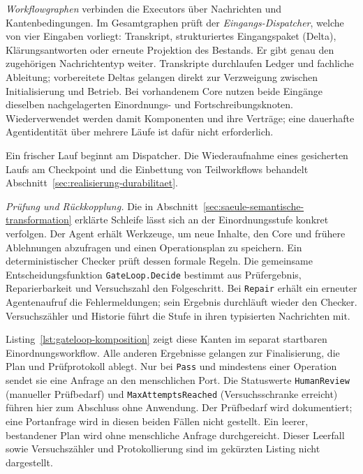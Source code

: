 \emph{Workflowgraphen} verbinden die Executors über Nachrichten
und Kantenbedingungen. Im Gesamtgraphen prüft der
\emph{Eingangs-Dispatcher}, welche von vier Eingaben vorliegt:
Transkript, strukturiertes Eingangspaket (Delta), Klärungsantworten
oder erneute Projektion des Bestands. Er gibt genau den
zugehörigen Nachrichtentyp weiter. Transkripte durchlaufen Ledger
und fachliche Ableitung; vorbereitete Deltas gelangen direkt zur
Verzweigung zwischen Initialisierung und Betrieb. Bei vorhandenem
Core nutzen beide Eingänge dieselben nachgelagerten Einordnungs-
und Fortschreibungsknoten. Wiederverwendet werden damit
Komponenten und ihre Verträge; eine dauerhafte Agentidentität
über mehrere Läufe ist dafür nicht erforderlich.

Ein frischer Lauf beginnt am Dispatcher. Die Wiederaufnahme eines
gesicherten Laufs am Checkpoint und die Einbettung von
Teilworkflows behandelt
Abschnitt~\ref{sec:realisierung-durabilitaet}.

\emph{Prüfung und Rückkopplung.} Die in
Abschnitt~\ref{sec:saeule-semantische-transformation} erklärte
Schleife lässt sich an der Einordnungsstufe konkret verfolgen.
Der Agent erhält Werkzeuge, um neue Inhalte, den Core und frühere
Ablehnungen abzufragen und einen Operationsplan zu speichern.
Ein deterministischer Checker prüft dessen formale Regeln.
Die gemeinsame Entscheidungsfunktion \texttt{GateLoop.Decide}
bestimmt aus Prüfergebnis, Reparierbarkeit und Versuchszahl den
Folgeschritt. Bei \texttt{Repair} erhält ein erneuter
Agentenaufruf die Fehlermeldungen; sein Ergebnis durchläuft
wieder den Checker. Versuchszähler und Historie führt die Stufe
in ihren typisierten Nachrichten mit.

Listing~\ref{lst:gateloop-komposition} zeigt diese Kanten im
separat startbaren Einordnungsworkflow. Alle anderen Ergebnisse
gelangen zur Finalisierung, die Plan und Prüfprotokoll ablegt.
Nur bei \texttt{Pass} und mindestens einer Operation
sendet sie eine Anfrage an den menschlichen Port. Die Statuswerte
\texttt{HumanReview} (manueller Prüfbedarf) und
\texttt{MaxAttemptsReached} (Versuchsschranke erreicht) führen hier
zum Abschluss ohne Anwendung. Der Prüfbedarf wird dokumentiert;
eine Portanfrage wird in diesen beiden Fällen nicht gestellt.
Ein leerer, bestandener Plan wird ohne menschliche Anfrage
durchgereicht. Dieser Leerfall sowie Versuchszähler und
Protokollierung sind im gekürzten Listing nicht dargestellt.

